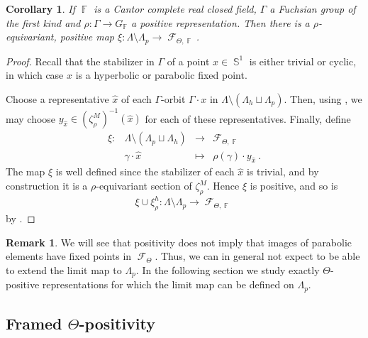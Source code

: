 \documentclass{amsart}
\theoremstyle{plain}
\newtheorem{corollary}[proposition]{Corollary}
\theoremstyle{definition}
\newtheorem{remark}[proposition]{Remark}
\DeclareMathOperator{\Fc}{\mathcal{F}}
\DeclareMathOperator{\Fb}{{\mathbb{F}}}
\DeclareMathOperator{\Sb}{\mathbb{S}}
\newcommand{\1}{\mathbf{1}}
\begin{document}
\begin{corollary}\label{cor:ClosedSurfExtensionLimitMap}
    If $\Fb$ is a Cantor complete real closed field, $\Gamma$ a Fuchsian group of the first kind and $\rho \colon \Gamma \to G_{\Fb}$ a positive representation.
    Then there is a $\rho$-equivariant, positive map $\xi:\Lambda \setminus \Lambda_p\to\Fc_{\Theta,\Fb}$.
\end{corollary}

\begin{proof}
    Recall that the stabilizer in $\Gamma$ of a point $x\in \Sb^1$ is either trivial or cyclic, in which case $x$ is a hyperbolic or parabolic fixed point. 

    Choose a representative $\hat x$ of each $\Gamma$-orbit $\Gamma \cdot x$ in $\Lambda \setminus (\Lambda_h \sqcup \Lambda_p)$. Then, using , we may choose $y_{\hat x} \in (\zeta^M_\rho)^{-1}(\hat x)$ for each of these representatives. Finally, define
    \[\begin{array}{cccc}
    \xi: & \Lambda\setminus (\Lambda_p\sqcup \Lambda_h) & \to & \Fc_{\Theta, \Fb}\\
    & \gamma \cdot \hat x & \mapsto & \rho(\gamma) \cdot y_{\hat x}~.
    \end{array}\]
    The map $\xi$ is well defined since the stabilizer of each $\hat x$ is trivial, and by construction it is a $\rho$-equivariant section of $\zeta^M_\rho$. Hence $\xi$ is positive, and so is 
    \[\xi \cup \xi^h_\rho\colon \Lambda \setminus \Lambda_p\to\Fc_{\Theta,\Fb}\]
    by .
\end{proof}



\begin{remark}
    We will see that positivity does not imply that images of parabolic elements have fixed points in $\Fc_\Theta$.
    Thus, we can in general not expect to be able to extend the limit map to $\Lambda_p$.
    In the following section we study exactly $\Theta$-positive representations for which the limit map can be defined on $\Lambda_p$.
\end{remark}


\subsection{%
\texorpdfstring{%
Framed $\Theta$-positivity}%
{Framed Theta-positivity}}
\label{s: Framed Positivity}
\end{document}
